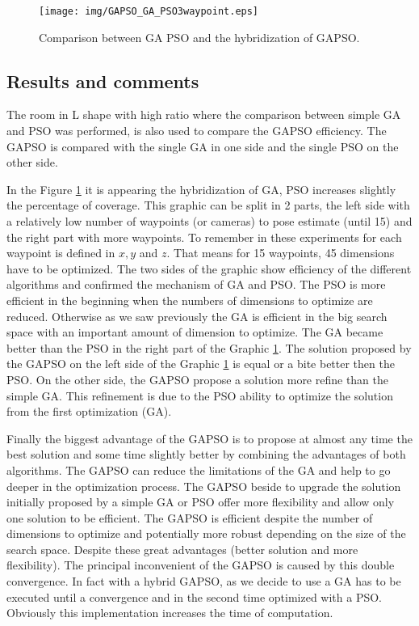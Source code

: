 \begin{figure}[t]
  \texttt{[image: img/GAPSO\_GA\_PSO3waypoint.eps]}
  \caption{Comparison between GA PSO and the hybridization of GAPSO.
}\label{fig:GAPSO}
  \endminipage\hfill
\end{figure}

 \subsection{Results and comments }
  

The room in L shape with high ratio where the comparison between simple GA and PSO was performed, is also used to compare the GAPSO efficiency. The GAPSO is compared with the single GA in one side and the single PSO on the other side. 

In the Figure \ref{fig:GAPSO} it is appearing the hybridization of GA, PSO increases slightly the percentage of coverage.%
This graphic can be split in 2 parts, the left side with a relatively low number of waypoints (or cameras) to pose estimate (until 15) and the right part with more waypoints. To remember in these experiments for each waypoint is defined in $x, y$ and $z$. That means for 15 waypoints, 45 dimensions have to be optimized.
The two sides of the graphic show efficiency of the different algorithms and confirmed the mechanism of GA and PSO.
The PSO is more efficient in the beginning when the numbers of dimensions to optimize are reduced. Otherwise as we saw previously the GA is efficient in the big search space with an important amount of dimension to optimize. The GA became better than the PSO in the right part of the Graphic \ref{fig:GAPSO}. 
The solution  proposed by the GAPSO on the left side of the Graphic \ref{fig:GAPSO} is equal or a bite better then the PSO. On the other side, the GAPSO propose a solution more refine than the simple GA. This refinement is due to the PSO ability to optimize the solution from the first optimization (GA). 

Finally the biggest advantage of the GAPSO is to propose at almost any time the best solution and some time slightly better by combining the advantages of both algorithms. 
The GAPSO can reduce the limitations of the GA and help to go deeper in the optimization process. The GAPSO  beside to upgrade the solution initially proposed by a simple GA or PSO offer more flexibility and allow only one solution to be efficient. The GAPSO is efficient despite the number of dimensions to optimize and potentially more robust depending on the size of the search space.
Despite these great advantages (better solution and more flexibility).
The principal inconvenient of the GAPSO is caused by this double convergence. In fact with a hybrid GAPSO, as we decide to use a GA has to be executed until a convergence and in the second time optimized with a PSO. Obviously this implementation increases the time of computation.
 
